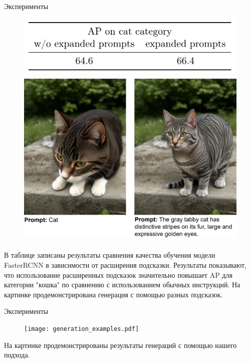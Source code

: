 \documentclass{beamer}
\begin{document}
\begin{frame}{Эксперименты}

\begin{figure}[!t]
    \centering
    \begin{minipage}{0.48\textwidth}
        \centering
        \includegraphics[width=\textwidth]{2.jpeg}
    \end{minipage} \hfill
    \begin{minipage}{0.48\textwidth}
        \centering
        \includegraphics[width=\textwidth]{3.jpeg}
    \end{minipage}
\end{figure}

\scriptsize
 В таблице записаны результаты сравнения качества обучения модели FasterRCNN в зависимости от расширения подсказки. Результаты показывают, что использование расширенных подсказок значительно повышает AP для категории "кошка" по сравнению с использованием обычных инструкций. На картинке продемонстрирована генерация с помощью разных подсказок.


\end{frame}

\begin{frame}{Эксперименты}

\begin{figure}[!t]
    \centering
    \texttt{[image: generation\_examples.pdf]}
\end{figure}

\scriptsize На картинке продемонстрированы результаты генераций с помощью нашего подхода.


\end{frame}
\end{document}

